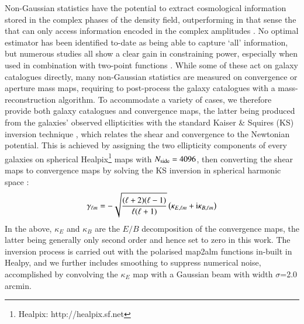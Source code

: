 Non-Gaussian statistics have the potential to extract cosmological information stored in the complex phases of the density field, outperforming in that sense the \gtwopcf that can only access information encoded in the complex amplitudes \citep{2002MNRAS.337..488C}.
No optimal estimator has been identified to-date as being able to capture `all' information, but numerous studies all show a clear gain in constraining power, especially when used in combination with two-point functions \citep{Fu2014, Gruen2017, HD21, DESY3_Zuercher, HSCY1_peaks_sims, KiDS1000_Burger, KiDS1000_Map3}.
While some of these act on galaxy catalogues directly, many non-Gaussian statistics are measured on convergence or aperture mass maps, requiring to post-process the galaxy catalogues with a mass-reconstruction algorithm.
To accommodate a variety of cases, we therefore provide both galaxy catalogues and convergence maps, the latter being  produced from the galaxies' observed ellipticities with the standard Kaiser \& Squires (KS)  inversion technique \citep{KaiserSquires}, which relates the shear and convergence to the Newtonian potential. This is achieved by assigning the two ellipticity components of every galaxies on spherical {\sc Healpix}\footnote{{\sc Healpix}: http://healpix.sf.net}  maps \citep{healpix} with $N_{\rm side}=4096$, then converting the shear maps to convergence maps by solving  the KS inversion in spherical harmonic space \citep[][see their equation 10]{Gatti20}:
\begin{eqnarray}
\gamma_{\ell m} = - \sqrt{\frac{(\ell+2)(\ell - 1)}{\ell(\ell+1)}}\left( \kappa_{E,\ell m} + {\rm i} \kappa_{B,\ell m} \right)
\label{eq:KS}
\end{eqnarray}
In the above, $\kappa_{E}$ and $\kappa_{B}$ are the $E/B$ decomposition of the convergence maps, the latter being generally only second order and hence set to zero in this work. 
The inversion process is carried out with the polarised  {\sc map2alm} functions  in-built in {\sc Healpy}, and we further includes smoothing to suppress numerical noise, accomplished by convolving the $\kappa_E$ map with  a Gaussian beam with width $\sigma$=2.0 arcmin.

